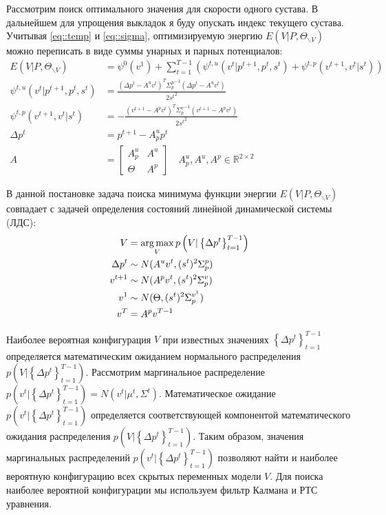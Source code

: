 Рассмотрим поиск оптимального значения для скорости одного сустава. В дальнейшем для упрощения выкладок я буду опускать индекс текущего сустава. Учитывая \eqref{eq::temp} и \eqref{eq::sigma}, оптимизируемую энергию $E(V|P, \Theta_{\backslash V})$ можно переписать в виде суммы унарных и парных потенциалов:
\begin{equation}
	\begin{aligned}
		E(V|P, \Theta_{\backslash V}) &= \psi^0(v^1) + \sum_{t=1}^{T-1} \left( \psi^{t,u}(v^t|p^{t+1}, p^{t}, s^t) + \psi^{t,p}(v^{t+1}, v^{t}|s^t) \right) \\		
		\psi^{t,u}(v^t|p^{t+1}, p^{t}, s^t) &= \frac{(\Delta p^t - A^u v^t)^T {\Sigma_p^p}^{-1} (\Delta p^t - A^u v^t)} {2 {s^t}^2} \\
		\psi^{t,p}(v^{t+1}, v^{t}|s^t) &= -\frac{(v^{t+1} - A^p v^t)^T {\Sigma_p^v}^{-1} (v^{t+1} - A^p v^t)} {2 {s^t}^2} \\ 
		\Delta p^t &= p^{t+1} - A_p^u p^t \\
		A &= \left[
		\begin{array}{c|c}
		A_p^u  & A^u \\ \hline
		\Theta & A^p
		\end{array}
		\right] \quad
		A_p^u, A^u, A^p \in \mathbb{R}^{2 \times 2}
	\end{aligned}
\end{equation}

В данной постановке задача поиска минимума функции энергии $E(V|P, \Theta_{\backslash V})$ совпадает с задачей определения состояний линейной динамической системы (ЛДС):
\begin{equation}
\begin{aligned}
V &= \operatorname*{arg\,max}_V {p\left(V | \left\{\Delta p^t
	\right\}_{t=1}^{T-1}\right)} \\ 
\Delta p^t &\sim N(A^u v^t, (s^t)^2\Sigma_p^p) \\
v^{t+1} &\sim N(A^p v^t, (s^t)^2\Sigma_p^v) \\
v^1 &\sim N(\Theta, (s^t)^2\Sigma_p^{v^1}) \\
v^T &= A^p v^{T-1}
\end{aligned}
\end{equation}

Наиболее вероятная конфигурация $V$ при известных значениях $\left\{\Delta p^t\right\}_{t=1}^{T-1}$ определяется математическим ожиданием нормального распределения $p\left(V| \left\{\Delta p^t\right\}_{t=1}^{T-1} \right)$. Рассмотрим маргинальное распределение $p(v^t|\left\{\Delta p^t\right\}_{t=1}^{T-1}) = N(v^t | \mu^t, \Sigma^t)$. Математическое ожидание $p(v^t|\left\{\Delta p^t\right\}_{t=1}^{T-1})$ определяется соответствующей компонентой математического ожидания распределения $p(V|\left\{\Delta p^t\right\}_{t=1}^{T-1})$. Таким образом, значения маргинальных распределений $p(v^t|\left\{\Delta p^t\right\}_{t=1}^{T-1})$ позволяют найти и наиболее вероятную конфигурацию всех скрытых переменных модели $V$. Для поиска наиболее вероятной конфигурации мы используем фильтр Калмана и РТС уравнения.

